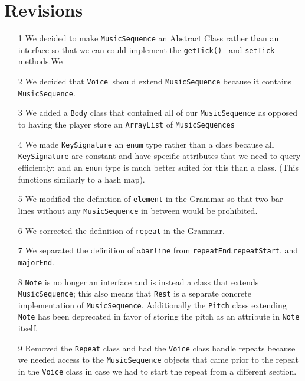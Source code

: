 \documentclass{article}
\begin{document}
\section{Revisions}
\begin{itemize}
	\item[1] We decided to make {\tt MusicSequence} an Abstract Class rather than an interface so that we can could implement the {\tt getTick() } and {\tt setTick }methods.We
	\item[2] We decided that { \tt Voice }should extend {\tt MusicSequence} because it contains {\tt MusicSequence}.
	\item[3] We added a {\tt Body} class that contained all of our {\tt MusicSequence} as opposed to having the player store an {\tt ArrayList} of {\tt MusicSequences}
	\item[4] We made {\tt KeySignature} an {\tt enum} type rather than a class because all {\tt KeySignature} are constant and have specific attributes that we need to query efficiently; and an {\tt enum} type is much better suited for this than a class. (This functions similarly to a hash map).
	\item[5] We modified the definition of {\tt element} in the Grammar so that two bar lines without any {\tt MusicSequence} in between would be prohibited.
	\item[6] We corrected the definition of {\tt repeat} in the Grammar.
	\item[7] We separated the definition of a{\tt barline} from {\tt repeatEnd},{\tt repeatStart}, and {\tt majorEnd}.
	\item[8] {\tt Note} is no longer an interface and is instead a class that extends {\tt MusicSequence}; this also means that {\tt Rest} is a separate concrete implementation of {\tt MusicSequence}. Additionally the {\tt Pitch} class extending {\tt Note} has been deprecated in favor of storing the pitch as an attribute in {\tt Note} itself.
	\item[9] Removed the {\tt Repeat} class and had the {\tt Voice} class handle repeats because we needed access to the {\tt MusicSequence} objects that came prior to the repeat in the {\tt Voice} class in case we had to start the repeat from a different section.
\end{itemize}
\end{document}
